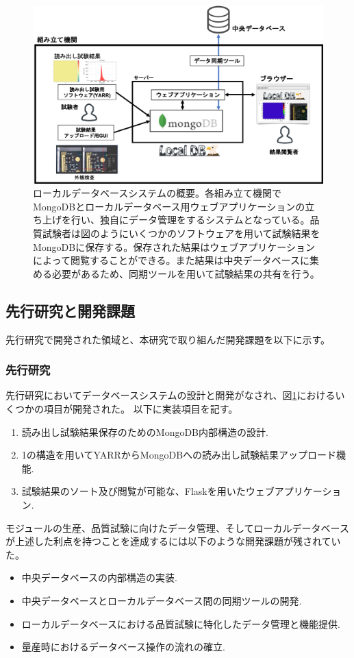 \begin{figure}[bpt]\centering
\includegraphics[width=12cm]{./localdb_overview.png}
\caption[ローカルデータベースシステムの概要]{ローカルデータベースシステムの概要。各組み立て機関でMongoDBとローカルデータベース用ウェブアプリケーションの立ち上げを行い、独自にデータ管理をするシステムとなっている。品質試験者は図のようにいくつかのソフトウェアを用いて試験結果をMongoDBに保存する。保存された結果はウェブアプリケーションによって閲覧することができる。また結果は中央データベースに集める必要があるため、同期ツールを用いて試験結果の共有を行う。}
\label{localdb_overview}
\end{figure}

\subsection{先行研究と開発課題}
先行研究で開発された領域と、本研究で取り組んだ開発課題を以下に示す。

\subsubsection{先行研究}
先行研究\cite{4-6}においてデータベースシステムの設計と開発がなされ、図\ref{localdb_overview}におけるいくつかの項目が開発された。
以下に実装項目を記す。
\begin{enumerate}
  \item 読み出し試験結果保存のためのMongoDB内部構造の設計.
  \item 1の構造を用いてYARRからMongoDBへの読み出し試験結果アップロード機能.
  \item 試験結果のソート及び閲覧が可能な、Flaskを用いたウェブアプリケーション. 
\end{enumerate}

モジュールの生産、品質試験に向けたデータ管理、そしてローカルデータベースが上述した利点を持つことを達成するには以下のような開発課題が残されていた。
\begin{itemize}
  \item 中央データベースの内部構造の実装.
  \item 中央データベースとローカルデータベース間の同期ツールの開発.
  \item ローカルデータベースにおける品質試験に特化したデータ管理と機能提供.
  \item 量産時におけるデータベース操作の流れの確立.
\end{itemize}

